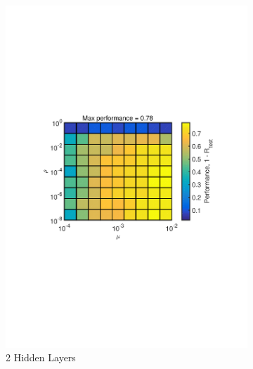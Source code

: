 \documentclass[journal,a4paper,onecolumn,11pt]{IEEEtran}
\begin{document}
\begin{figure}[!h] 
\centering
\begin{subfigure}{.5\textwidth}
  \centering
       \includegraphics[width=\textwidth]{para_opt_uppercasechar_sm_4layer.pdf}
  \caption{2 Hidden Layers}
    \label{fig:para_opt_uppercasechar_sm_4layer}
\end{subfigure}%
\begin{subfigure}{.5\textwidth}
  \centering

\end{subfigure}
\end{figure}
\end{document}
